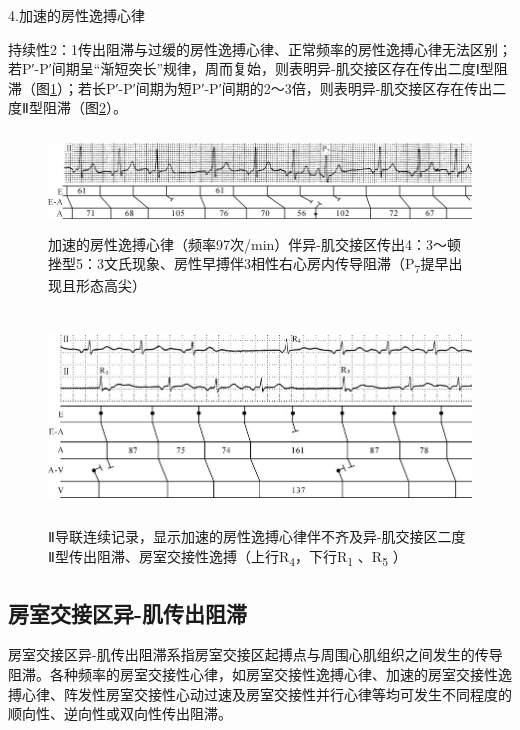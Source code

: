 4.加速的房性逸搏心律

持续性2：1传出阻滞与过缓的房性逸搏心律、正常频率的房性逸搏心律无法区别；若P′-P′间期呈“渐短突长”规律，周而复始，则表明异-肌交接区存在传出二度Ⅰ型阻滞（图\ref{fig23-4}）；若长P′-P′间期为短P′-P′间期的2～3倍，则表明异-肌交接区存在传出二度Ⅱ型阻滞（图\ref{fig23-5}）。

\begin{figure}[!htbp]
 \centering
 \includegraphics[width=5.78125in,height=1.02083in]{./images/Image00388.jpg}
 \captionsetup{justification=centering}
 \caption{加速的房性逸搏心律（频率97次/min）伴异-肌交接区传出4：3～顿挫型5：3文氏现象、房性早搏伴3相性右心房内传导阻滞（P\textsubscript{7}提早出现且形态高尖）}
 \label{fig23-4}
  \end{figure} 


\begin{figure}[!htbp]
 \centering
 \includegraphics[width=5.75in,height=2.21875in]{./images/Image00389.jpg}
 \captionsetup{justification=centering}
 \caption{Ⅱ导联连续记录，显示加速的房性逸搏心律伴不齐及异-肌交接区二度Ⅱ型传出阻滞、房室交接性逸搏（上行R\textsubscript{4}，下行R\textsubscript{1} 、R\textsubscript{5} ）}
 \label{fig23-5}
  \end{figure} 


\protect\hypertarget{text00030.htmlux5cux23subid362}{}{}

\subsection{房室交接区异-肌传出阻滞}

房室交接区异-肌传出阻滞系指房室交接区起搏点与周围心肌组织之间发生的传导阻滞。各种频率的房室交接性心律，如房室交接性逸搏心律、加速的房室交接性逸搏心律、阵发性房室交接性心动过速及房室交接性并行心律等均可发生不同程度的顺向性、逆向性或双向性传出阻滞。

